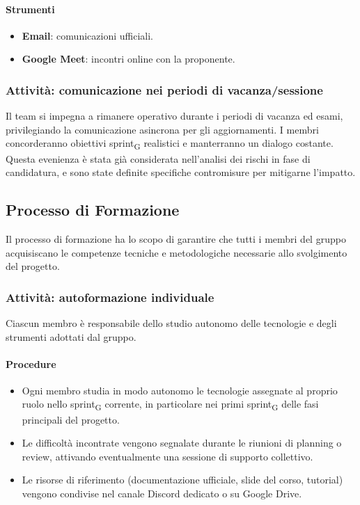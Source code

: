 \documentclass[11pt,a4paper]{article}
\newcommand{\gls}[1]{#1\textsubscript{G}}
\begin{document}
\paragraph{Strumenti}
\begin{itemize}
    \item \textbf{Email}: comunicazioni ufficiali.
    \item \textbf{Google Meet}: incontri online con la proponente.
\end{itemize}

\subsubsection{Attività: comunicazione nei periodi di vacanza/sessione}
Il team si impegna a rimanere operativo durante i periodi di vacanza ed esami, privilegiando la comunicazione asincrona per gli aggiornamenti. I membri concorderanno obiettivi \gls{sprint} realistici e manterranno un dialogo costante.
Questa evenienza è stata già considerata nell'analisi dei rischi in fase di
candidatura, e sono state definite specifiche contromisure per mitigarne l'impatto.


\subsection{Processo di Formazione}
Il processo di formazione ha lo scopo di garantire che tutti i membri del gruppo acquisiscano le competenze tecniche e metodologiche necessarie allo svolgimento del progetto.

\subsubsection{Attività: autoformazione individuale}
Ciascun membro è responsabile dello studio autonomo delle tecnologie e degli
strumenti adottati dal gruppo.

\paragraph{Procedure}
\begin{itemize}
    \item Ogni membro studia in modo autonomo le tecnologie assegnate al proprio ruolo nello \gls{sprint} corrente, in particolare nei primi \gls{sprint} delle fasi principali del progetto.
    \item Le difficoltà incontrate vengono segnalate durante le riunioni di
    planning o review, attivando eventualmente una sessione di supporto collettivo.
    \item Le risorse di riferimento (documentazione ufficiale, slide del corso, tutorial) vengono condivise nel canale Discord dedicato o su Google Drive.
\end{itemize}
\end{document}
